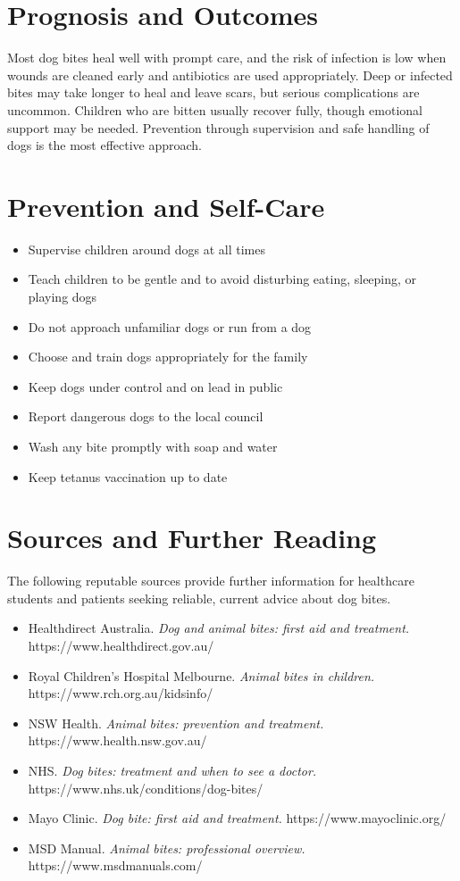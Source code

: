 \section*{Prognosis and Outcomes}
Most dog bites heal well with prompt care, and the risk of infection is low when wounds are cleaned early and antibiotics are used appropriately. Deep or infected bites may take longer to heal and leave scars, but serious complications are uncommon. Children who are bitten usually recover fully, though emotional support may be needed. Prevention through supervision and safe handling of dogs is the most effective approach.

\section*{Prevention and Self-Care}
\begin{itemize}
    \item Supervise children around dogs at all times
    \item Teach children to be gentle and to avoid disturbing eating, sleeping, or playing dogs
    \item Do not approach unfamiliar dogs or run from a dog
    \item Choose and train dogs appropriately for the family
    \item Keep dogs under control and on lead in public
    \item Report dangerous dogs to the local council
    \item Wash any bite promptly with soap and water
    \item Keep tetanus vaccination up to date
\end{itemize}

\section*{Sources and Further Reading}
The following reputable sources provide further information for healthcare students and patients seeking reliable, current advice about dog bites.

\begin{itemize}
    \item Healthdirect Australia. \textit{Dog and animal bites: first aid and treatment.} https://www.healthdirect.gov.au/
    \item Royal Children's Hospital Melbourne. \textit{Animal bites in children.} https://www.rch.org.au/kidsinfo/
    \item NSW Health. \textit{Animal bites: prevention and treatment.} https://www.health.nsw.gov.au/
    \item NHS. \textit{Dog bites: treatment and when to see a doctor.} https://www.nhs.uk/conditions/dog-bites/
    \item Mayo Clinic. \textit{Dog bite: first aid and treatment.} https://www.mayoclinic.org/
    \item MSD Manual. \textit{Animal bites: professional overview.} https://www.msdmanuals.com/
\end{itemize}
